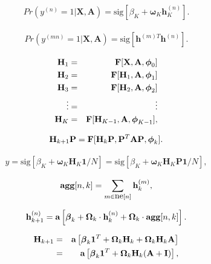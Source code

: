 \documentclass[letterpaper,twoside,openany, titlepage,oldfontcommands,titles,dvipsnames]{memoir}
\begin{document}
\begin{eqnarray}\label{eq:graph_node_level}
 Pr(y^{(n)}=1|\mathbf{X},\mathbf{A}) = \mbox{sig}\left[\beta_{K}+\boldsymbol\omega_{K}\mathbf{h}^{(n)}_{K}\right].
 \end{eqnarray}

\begin{eqnarray}
  Pr(y^{(mn)}=1|\mathbf{X},\mathbf{A}) = \mbox{sig}\left[\mathbf{h}^{(m)T}\mathbf{h}^{(n)}\right].
 \end{eqnarray}

\begin{eqnarray}
 \mathbf{H}_1 &=& \mbox{\bf F}[\mathbf{X},\mathbf{A},\boldsymbol\phi_0]\nonumber \\
 \mathbf{H}_2 &=& \mbox{\bf F}[\mathbf{H}_1,\mathbf{A},\boldsymbol\phi_1]\nonumber \\
 \mathbf{H}_3 &=& \mbox{\bf F}[\mathbf{H}_2,\mathbf{A},\boldsymbol\phi_2]\nonumber \\
 \vdots &=& \vdots \nonumber \\
 \mathbf{H}_K &=& \mbox{\bf F}[\mathbf{H}_{K-1},\mathbf{A},\boldsymbol\phi_{K-1}],
 \end{eqnarray}

\begin{eqnarray}
 \mathbf{H}_{k+1}\mathbf{P} =\mbox{\bf F}[\mathbf{H}_k\mathbf{P},\mathbf{P}^{T}\mathbf{A}\mathbf{P},\boldsymbol\phi_k].
 \end{eqnarray}

\begin{eqnarray}\label{eq:graph_output_invar}
 y = \mbox{sig}\left[\beta_{K}+\boldsymbol\omega_{K}\mathbf{H}_{K}\mathbf{1}/N\right] = \mbox{sig}\left[\beta_{K}+\boldsymbol\omega_{K}\mathbf{H}_{K}\mathbf{P}\mathbf{1}/N\right],
 \end{eqnarray}

\begin{eqnarray}
 \mbox{\bf agg}[n,k] = \sum_{m\in\mbox{ne}[n]}\mathbf{h}_k^{(m)},
 \end{eqnarray}

\begin{eqnarray}
  \mathbf{h}^{(n)}_{k+1} = \mbox{\bf a}\left[\boldsymbol\beta_{k} + \boldsymbol\Omega_{k} \cdot \mathbf{h}^{(n)}_{k} +\boldsymbol\Omega_{k} \cdot \mbox{\bf agg}[n,k]\right].
 \end{eqnarray}

\begin{eqnarray}\label{eq:graph_concat_update}
 \mathbf{H}_{k+1} &=& \mbox{\bf a}\left[\boldsymbol\beta_{k}\mathbf{1}^{T} + \boldsymbol\Omega_{k}\mathbf{H}_{k} +\boldsymbol\Omega_{k} \mathbf{H}_{k}\mathbf{A} \right]\nonumber \\
 & =& \mbox{\bf a}\left[\boldsymbol\beta_{k}\mathbf{1}^{T} +\boldsymbol\Omega_{k} \mathbf{H}_{k}(\mathbf{A}+\mathbf{I}) \right],
 \end{eqnarray}
\end{document}
